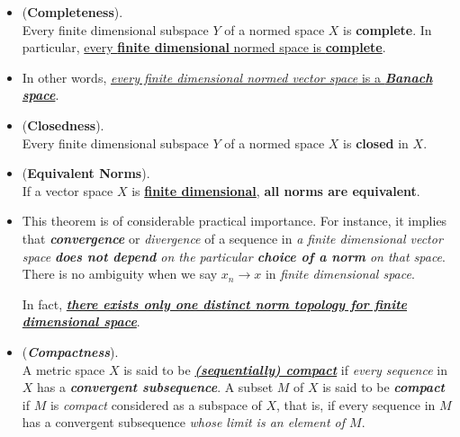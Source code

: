 \documentclass[11pt]{article}
\begin{document}
\begin{itemize}
\item \begin{theorem} (\textbf{Completeness}). \citep{kreyszig1989introductory} \\
Every finite dimensional subspace $Y$ of a normed space $X$ is \textbf{complete}. In particular, \underline{every \textbf{finite dimensional} normed space is \textbf{complete}}.
\end{theorem}

\item \begin{remark}
In other words, \underline{\emph{every finite dimensional normed vector space} is a \emph{\textbf{Banach space}}}.
\end{remark}

\item \begin{proposition} (\textbf{Closedness}).  \citep{kreyszig1989introductory}\\
Every finite dimensional subspace $Y$ of a normed space $X$ is \textbf{closed} in $X$.
\end{proposition}

\item \begin{theorem} (\textbf{Equivalent Norms}). \citep{kreyszig1989introductory}\\
If a vector space $X$ is \underline{\textbf{finite dimensional}}, \textbf{all norms are equivalent}.
\end{theorem}


\item \begin{remark}
This theorem is of considerable practical importance. For instance, it implies that \emph{\textbf{convergence}} or \emph{divergence} of a sequence in \emph{a finite dimensional vector space} \emph{\textbf{does not depend} on the particular \textbf{choice of a norm} on that space}. There is no ambiguity when we say $x_n \rightarrow x$ in \emph{finite dimensional space}.

In fact, \underline{\emph{\textbf{there exists only one distinct norm topology for finite dimensional space}}}. 
\end{remark}

\item \begin{definition} (\emph{\textbf{Compactness}}). \\
A metric space $X$ is said to be \underline{\emph{\textbf{(sequentially) compact}}} if \emph{every sequence} in $X$ has a \emph{\textbf{convergent subsequence}}. A subset $M$ of $X$ is said to be \emph{\textbf{compact}} if $M$ is \emph{compact} considered as a subspace of $X$, that is, if every sequence in $M$ has a convergent subsequence \emph{whose limit is an element of $M$}.
\end{definition}


\end{itemize}
\end{document}

